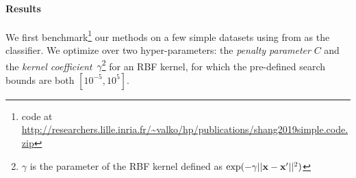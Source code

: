 \paragraph{Results} We first benchmark\footnote{code at \url{http://researchers.lille.inria.fr/~valko/hp/publications/shang2019simple.code.zip}} our methods on a few simple \UCI datasets using \SVM from \Scikit as the classifier. We  optimize over two hyper-parameters: the \emph{penalty parameter} $C$ and the \emph{kernel coefficient}~$\gamma$\footnote{$\gamma$ is the parameter of the RBF kernel defined as $\exp(-\gamma||{\bf x}-{\bf x}'||^2)$}
for an RBF kernel, for which the pre-defined search bounds are both $\left[10^{-5}, 10^{5} \right]$.



